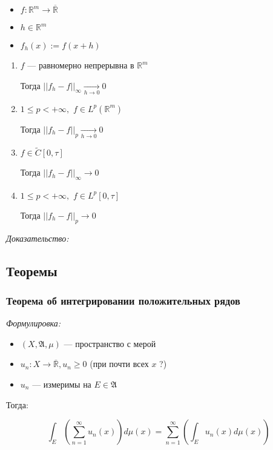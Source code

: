 \documentclass{article}
\def\dbl{\,\,}
\def\rinf{\overline{\mathbb{R}}}
\def\goesto#1{\underset{#1}{\longrightarrow}}
\begin{document}
    \begin{itemize}
        \item $f: \mathbb{R}^{m} \rightarrow \rinf$
        \item $h \in \mathbb{R}^{m}$
        \item $f_{h}(x) := f(x + h)$
    \end{itemize}

    \begin{enumerate}
        \item $f$ --- равномерно непрерывна в $\mathbb{R}^{m}$
        
        Тогда $||f_h - f||_{\infty} \goesto{h \rightarrow 0} 0$

        \item $1 \le p < +\infty, \dbl f \in L^{p}(\mathbb{R}^{m})$
        
        Тогда $||f_h - f||_{p} \goesto{h \rightarrow 0} 0$

        \item $f \in \tilde{C}[0, \tau]$
        
        Тогда $||f_h - f||_{\infty} \goesto{} 0$

        \item $1 \le p < +\infty, \dbl f \in L^{p}[0, \tau]$
        
        Тогда $||f_h - f||_{p} \goesto{} 0$
    \end{enumerate}

    \textit{Доказательство:}
\newpage

\subsection{Теоремы}

\subsubsection{Теорема об интегрировании положительных рядов}
\textit{Формулировка:}

\begin{itemize}
    \item $(X, \mathfrak{A}, \mu)$ --- пространство с мерой
    \item $u_n: X \rightarrow \rinf, u_n \ge 0$ (при почти всех $x$ ?)
    \item $u_n$ --- измеримы на $E \in \mathfrak{A}$
\end{itemize}

Тогда: 

\[\int_{E} \left(\sum_{n = 1}^{\infty} u_n(x)\right)d\mu(x) = \sum_{n = 1}^{\infty} \left(\int_{E} u_n(x) d\mu(x)\right)\]
\end{document}
